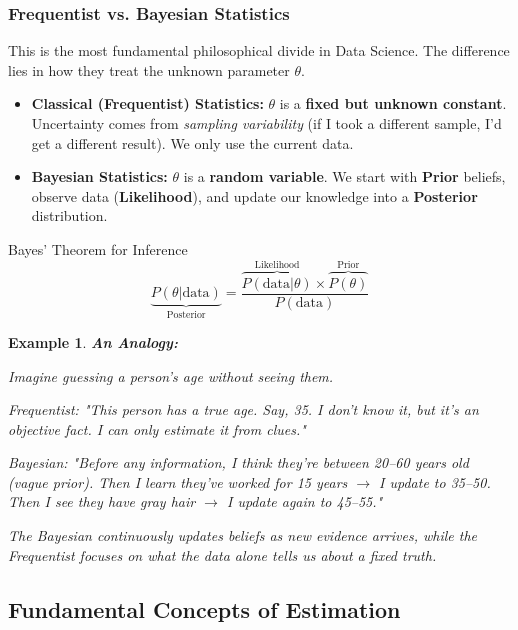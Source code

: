 \documentclass[11pt]{article}
\theoremstyle{smallexample}
\newtheorem{example}{Example}[section]
\newcommand{\vs}{\vspace{0.2\baselineskip}}
\begin{document}
\subsubsection{Frequentist vs. Bayesian Statistics}
This is the most fundamental philosophical divide in Data Science. The difference lies in how they treat the unknown parameter $\theta$.

\begin{itemize}
    \item \textbf{Classical (Frequentist) Statistics:} $\theta$ is a \textbf{fixed but unknown constant}. Uncertainty comes from \textit{sampling variability} (if I took a different sample, I'd get a different result). We only use the current data.
    \item \textbf{Bayesian Statistics:} $\theta$ is a \textbf{random variable}. We start with \textbf{Prior} beliefs, observe data (\textbf{Likelihood}), and update our knowledge into a \textbf{Posterior} distribution.
\end{itemize}

\begin{defbox}{Bayes' Theorem for Inference}
\[
\underbrace{P(\theta | \text{data})}_{\text{Posterior}} = \frac{\overbrace{P(\text{data} | \theta)}^{\text{Likelihood}} \times \overbrace{P(\theta)}^{\text{Prior}}}{P(\text{data})}
\]
\end{defbox}


\vs

\begin{example} {\textbf{An Analogy:}}
  
  Imagine guessing a person's age without seeing them.

\textit{Frequentist:} "This person has a true age.  Say, 35. I don't know it, but it's an objective fact. I can only estimate it from clues."

\textit{Bayesian:} "Before any information, I think they're between 20–60 years old (vague prior). Then I learn they've worked for 15 years $\rightarrow$ I update to 35–50. Then I see they have gray hair $\rightarrow$ I update again to 45–55."

The Bayesian continuously \textit{updates beliefs} as new evidence arrives, while the Frequentist focuses on \textit{what the data alone tells us} about a fixed truth.

\end{example}

\subsection{Fundamental Concepts of Estimation}
\end{document}
